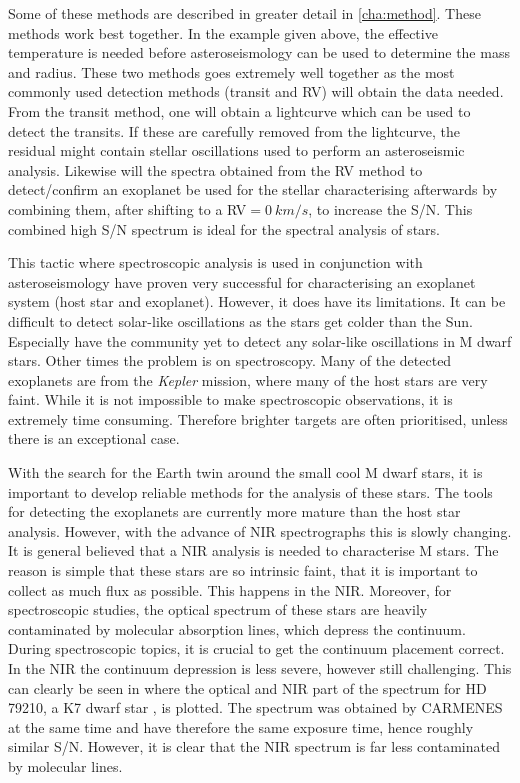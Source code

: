 Some of these methods are described in greater detail in \cref{cha:method}. These methods work best
together. In the example given above, the effective temperature is needed before asteroseismology
can be used to determine the mass and radius. These two methods goes extremely well together as the
most commonly used detection methods (transit and RV) will obtain the data needed. From the transit
method, one will obtain a lightcurve which can be used to detect the transits. If these are
carefully removed from the lightcurve, the residual might contain stellar oscillations used to
perform an asteroseismic analysis. Likewise will the spectra obtained from the RV method to
detect/confirm an exoplanet be used for the stellar characterising afterwards by combining them,
after shifting to a RV$=\SI{0}{km/s}$, to increase the S/N. This combined high S/N spectrum is ideal
for the spectral analysis of stars.

This tactic where spectroscopic analysis is used in conjunction with asteroseismology have proven
very successful for characterising an exoplanet system (host star and
exoplanet). However, it does have its limitations. It can be difficult to detect solar-like
oscillations as the stars get colder than the Sun. Especially have the community yet to detect any
solar-like oscillations in M dwarf stars. Other times the problem is on
spectroscopy. Many of the detected exoplanets are from the \emph{Kepler} mission, where many of the
host stars are very faint. While it is not impossible to make spectroscopic observations, it is
extremely time consuming. Therefore brighter targets are often prioritised, unless there is an
exceptional case.

With the search for the Earth twin around the small cool M dwarf stars, it is important to develop
reliable methods for the analysis of these stars. The tools for detecting the exoplanets are
currently more mature than the host star analysis. However, with the advance of NIR spectrographs
this is slowly changing. It is general believed that a NIR analysis is needed to characterise M
stars. The reason is simple that these stars are so intrinsic faint, that it is important to collect
as much flux as possible. This happens in the NIR. Moreover, for spectroscopic studies, the optical
spectrum of these stars are heavily contaminated by molecular absorption lines, which depress the
continuum. During spectroscopic topics, it is crucial to get the continuum placement correct. In the
NIR the continuum depression is less severe, however still challenging. This can clearly be seen in
 where the optical and NIR part of the spectrum for HD 79210, a K7 dwarf star
\citep{Kirkpatrick1991}, is plotted. The spectrum was obtained by CARMENES at the same time and have
therefore the same exposure time, hence roughly similar S/N. However, it is clear that the NIR
spectrum is far less contaminated by molecular lines.


